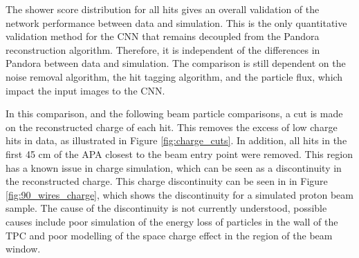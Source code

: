 The shower score distribution for all hits gives an overall validation of the 
network performance between data and simulation. This is the only quantitative 
validation method for the CNN that remains decoupled from the Pandora 
reconstruction algorithm. Therefore, it is independent of the differences in 
Pandora between data and simulation. The comparison is still dependent on the 
noise removal algorithm, the hit tagging algorithm, and the particle flux, 
which impact the input images to the CNN.

In this comparison, and the following beam particle comparisons, a cut is made 
on the reconstructed charge of each hit. This removes the excess of low 
charge hits in data, as illustrated in Figure \ref{fig:charge_cuts}. In 
addition, all hits in the first 45 cm of the APA closest to the beam entry 
point were removed. This region has a known issue in charge simulation, which 
can be seen as a discontinuity in the reconstructed charge. This charge 
discontinuity can be seen in in Figure \ref{fig:90_wires_charge}, which 
shows the discontinuity for a simulated proton beam sample. The cause of the
discontinuity is not currently understood, possible causes include poor
simulation of the energy loss of particles in the wall of the TPC and poor
modelling of the space charge effect in the region of the beam window.

